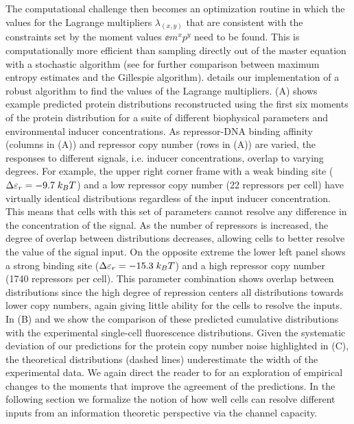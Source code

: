 The computational challenge then becomes an optimization routine in which the
values for the Lagrange multipliers $\lambda_{(x,y)}$ that are consistent with
the constraints set by the moment values $\ee{m^x p^y}$ need to be found. This
is computationally more efficient than sampling directly out of the master
equation with a stochastic algorithm (see  for further
comparison between maximum entropy estimates and the Gillespie algorithm).
 details our implementation of a robust algorithm to find
the values of the Lagrange multipliers. (A) shows example
predicted protein distributions reconstructed using the first six moments of
the protein distribution for a suite of different biophysical parameters and
environmental inducer concentrations. As repressor-DNA binding affinity
(columns in (A)) and repressor copy number (rows in
(A)) are varied, the responses to different signals, i.e.
inducer concentrations, overlap to varying degrees. For example, the upper
right corner frame with a weak binding site ($\Delta\varepsilon_r = -9.7 \; k_BT$) and a low
repressor copy number (22 repressors per cell) have virtually identical
distributions regardless of the input inducer concentration. This means that
cells with this set of parameters cannot resolve any difference in the
concentration of the signal. As the number of repressors is increased, the
degree of overlap between distributions decreases, allowing cells to better
resolve the value of the signal input. On the opposite extreme the lower left
panel shows a strong binding site ($\Delta\varepsilon_r = -15.3 \; k_BT$) and a high repressor
copy number (1740 repressors per cell). This parameter combination shows
overlap between distributions since the high degree of repression centers all
distributions towards lower copy numbers, again giving little ability for the
cells to resolve the inputs. In (B) and 
we show the comparison of these predicted cumulative distributions with the
experimental single-cell fluorescence distributions. Given the systematic
deviation of our predictions for the protein copy number noise highlighted in
(C), the theoretical distributions (dashed lines)
underestimate the width of the experimental data. We again direct the reader to
 for an exploration of empirical changes to the moments that
improve the agreement of the predictions. In the following section we formalize
the notion of how well cells can resolve different inputs from an information
theoretic perspective via the channel capacity.

